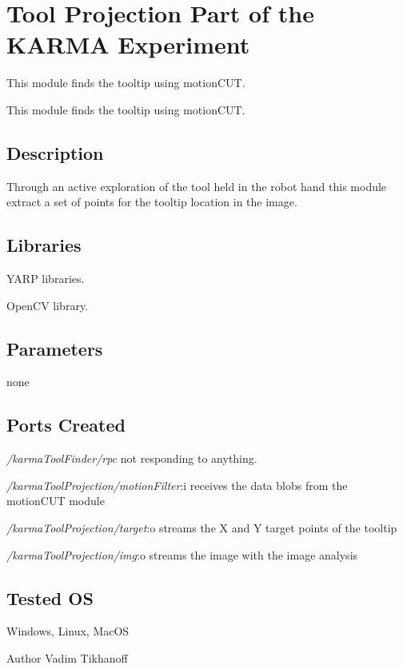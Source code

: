 \section{Tool Projection Part of the K\+A\+R\+M\+A Experiment}
\label{group__karmaToolProjection}


This module finds the tooltip using motion\+C\+U\+T.  


This module finds the tooltip using motion\+C\+U\+T. 

\hypertarget{group__karmaToolProjection_intro_sec}{}\subsection{Description}\label{group__karmaToolProjection_intro_sec}
Through an active exploration of the tool held in the robot hand this module extract a set of points for the tooltip location in the image.\hypertarget{group__karmaToolProjection_lib_sec}{}\subsection{Libraries}\label{group__karmaToolProjection_lib_sec}

\begin{DoxyItemize}
\item Y\+A\+R\+P libraries.
\item Open\+C\+V library.
\end{DoxyItemize}\hypertarget{group__karmaToolProjection_parameters_sec}{}\subsection{Parameters}\label{group__karmaToolProjection_parameters_sec}
none\hypertarget{group__karmaToolProjection_portsc_sec}{}\subsection{Ports Created}\label{group__karmaToolProjection_portsc_sec}

\begin{DoxyItemize}
\item {\itshape /karma\+Tool\+Finder/rpc} not responding to anything.
\item {\itshape /karma\+Tool\+Projection/motion\+Filter}\+:i receives the data blobs from the motion\+C\+U\+T module
\item {\itshape /karma\+Tool\+Projection/target}\+:o streams the X and Y target points of the tooltip
\item {\itshape /karma\+Tool\+Projection/img}\+:o streams the image with the image analysis
\end{DoxyItemize}\hypertarget{group__karmaToolProjection_tested_os_sec}{}\subsection{Tested O\+S}\label{group__karmaToolProjection_tested_os_sec}
Windows, Linux, Mac\+O\+S

\begin{DoxyAuthor}{Author}
Vadim Tikhanoff 
\end{DoxyAuthor}
